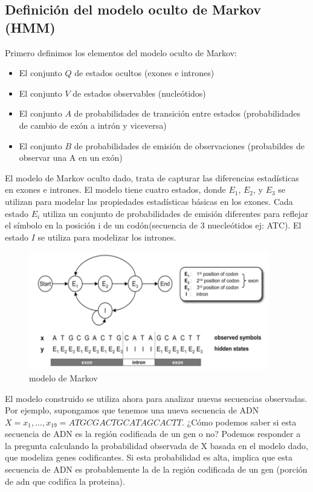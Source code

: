 \documentclass[11pt,openany]{book}
\begin{document}
\subsection*{Definición del modelo oculto de Markov (HMM)}
      Primero definimos los elementos del modelo oculto de Markov:
      \begin{itemize}
            \item El conjunto $Q$ de estados ocultos (exones e intrones)
            \item El conjunto $V$ de estados observables (nucleótidos)
            \item El conjunto $A$ de probabilidades de transición entre estados (probabilidades de cambio de exón a intrón y viceversa)
            \item El conjunto $B$ de probabilidades de emisión de observaciones (probabildes de observar una A en un exón)
      \end{itemize}
El modelo de Markov oculto dado,
trata de capturar las diferencias estadísticas en exones e intrones. El modelo tiene
cuatro estados, donde $E_1$, $E_2$, y $E_3$ se utilizan para modelar las propiedades estadísticas básicas en los exones. Cada estado $E_i$ utiliza un conjunto de probabilidades de
emisión diferentes para reflejar el símbolo en la posición i de un codón(secuencia de 3 nuecleótidos ej: ATC). El estado $I$
se utiliza para modelizar los intrones.
\begin{figure}[H]
      \centering
      \begin{minipage}{.48\textwidth}
          \centering
          \includegraphics[width=1\linewidth]{assets/Img/modelo oculto modelizar procariotas.png}
          \caption{modelo de Markov}
          \label{fig:Modelo de markov para modelizar genes de procariotas}
    \end{minipage}%

  \end{figure}
  El modelo construido  se utiliza ahora para analizar nuevas secuencias observadas. Por ejemplo, supongamos que tenemos una nueva secuencia de ADN $X =
x_1, . . . , x_19 = ATGCGACTGCATAGCACTT$. ¿Cómo podemos saber si esta secuencia de ADN es la región codificada de un gen o no? 
Podemos responder a la  pregunta calculando la probabilidad observada de X basada en el modelo dado, que modeliza
genes codificantes. Si esta probabilidad es alta, implica que esta secuencia de ADN
es probablemente la de la región codificada de un gen (porción de adn que codifíca la proteina).
\end{document}
